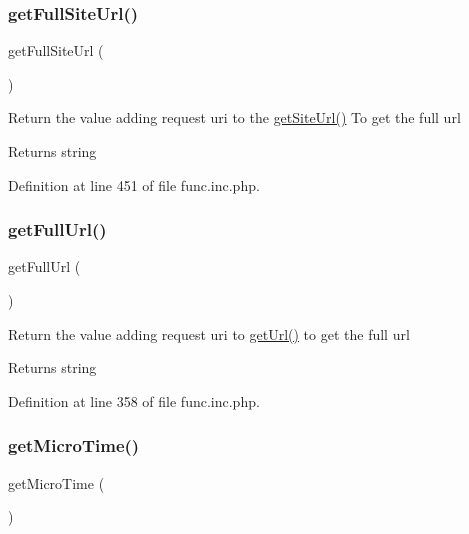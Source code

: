 \subsubsection{\texorpdfstring{get\+Full\+Site\+Url()}{getFullSiteUrl()}}
{\footnotesize\ttfamily get\+Full\+Site\+Url (\begin{DoxyParamCaption}{ }\end{DoxyParamCaption})}

Return the value adding request uri to the \hyperlink{func_8inc_8php_a2d80ea9652d1586d5dcd03d022150f73}{get\+Site\+Url()} To get the full url

\begin{DoxyReturn}{Returns}
string 
\end{DoxyReturn}


Definition at line 451 of file func.\+inc.\+php.

\hypertarget{func_8inc_8php_acaf8f155dd27e065b7fb0f5c3f702027}{}\label{func_8inc_8php_acaf8f155dd27e065b7fb0f5c3f702027} 
\subsubsection{\texorpdfstring{get\+Full\+Url()}{getFullUrl()}}
{\footnotesize\ttfamily get\+Full\+Url (\begin{DoxyParamCaption}{ }\end{DoxyParamCaption})}

Return the value adding request uri to \hyperlink{func_8inc_8php_accd14bda49a1044b4d8dd93f020f11ee}{get\+Url()} to get the full url

\begin{DoxyReturn}{Returns}
string 
\end{DoxyReturn}


Definition at line 358 of file func.\+inc.\+php.

\hypertarget{func_8inc_8php_a83ff2cccfdfaf38ba29c8c6d04586deb}{}\label{func_8inc_8php_a83ff2cccfdfaf38ba29c8c6d04586deb} 
\subsubsection{\texorpdfstring{get\+Micro\+Time()}{getMicroTime()}}
{\footnotesize\ttfamily get\+Micro\+Time (\begin{DoxyParamCaption}{ }\end{DoxyParamCaption})}

